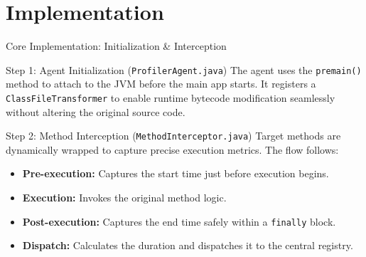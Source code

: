 \documentclass[aspectratio=169]{beamer}
\begin{document}
\section{Implementation}

\begin{frame}{Core Implementation: Initialization \& Interception}
    \begin{block}{Step 1: Agent Initialization (\texttt{ProfilerAgent.java})}
        \small
        The agent uses the \texttt{premain()} method to attach to the JVM before the main app starts. It registers a \texttt{ClassFileTransformer} to enable runtime bytecode modification seamlessly without altering the original source code.
    \end{block}

    \vspace{0.3cm}

    \begin{block}{Step 2: Method Interception (\texttt{MethodInterceptor.java})}
        \small
        Target methods are dynamically wrapped to capture precise execution metrics. The flow follows:
        \begin{itemize}
            \item \textbf{Pre-execution:} Captures the start time just before execution begins.
            \item \textbf{Execution:} Invokes the original method logic.
            \item \textbf{Post-execution:} Captures the end time safely within a \texttt{finally} block.
            \item \textbf{Dispatch:} Calculates the duration and dispatches it to the central registry.
        \end{itemize}
    \end{block}
\end{frame}
\end{document}
